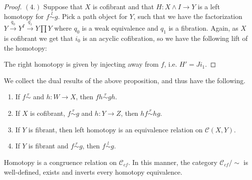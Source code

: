 \documentclass[../thesis.tex]{subfiles}
\begin{document}
\begin{proof}
                $(4.)$ Suppose that $X$ is cofibrant and that $H:X\wedge I\rightarrow Y$ is a left homotopy for $f \overset{l}{\sim} g$. Pick a path object for $Y$, such that we have the factorization $Y\overset{q_0}{\rightarrow}Y^I\overset{q_1}{\rightarrow}Y\prod Y$ where $q_0$ is a weak equivalence and $q_1$ is a fibration. Again, as $X$ is cofibrant we get that $i_0$ is an acyclic cofibration, so we have the following lift of the homotopy:
                \begin{center}
                \end{center}
                The right homotopy is given by injecting away from $f$, i.e. $H' = Ji_1$.
            \end{proof}

            \begin{corollary}
                We collect the dual results of the above proposition, and thus have the following.
                \begin{enumerate}
                    \item If $f \overset{r}{\sim}$ and $h: W \rightarrow X$, then $fh \overset{r}{\sim} gh$.
                    \item If $X$ is cofibrant, $f \overset{r}{\sim} g$ and $h: Y \rightarrow Z$, then $hf \overset{r}{\sim} hg$.
                    \item If $Y$ is fibrant, then left homotopy is an equivalence relation on $\mathcal{C}(X,Y)$.
                    \item If $Y$ is fibrant and $f \overset{r}{\sim} g$, then $f \overset{l}{\sim} g$.
                \end{enumerate}
            \end{corollary}

            \begin{corollary}\label{cor: homotopy-is-eq-rel}
                Homotopy is a congruence relation on $\mathcal{C}_{cf}$. In this manner, the category $\mathcal{C}_{cf}/\sim$ is well-defined, exists and inverts every homotopy equivalence.
            \end{corollary}
\end{document}
